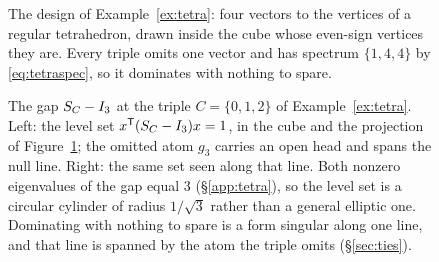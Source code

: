 \begin{figure}[ht]
  \centering
  
  \caption{The design of Example~\ref{ex:tetra}: four vectors to the
  vertices of a regular tetrahedron, drawn inside the cube whose even-sign
  vertices they are.  Every triple omits one vector and has spectrum
  $\{1,4,4\}$ by \eqref{eq:tetraspec}, so it dominates with nothing to
  spare.}
  \label{fig:tetrahedron}
\end{figure}

\begin{figure}[ht]
  \centering
  
  \caption{The gap $S_{C}-I_3$ at the triple $C=\{0,1,2\}$ of
  Example~\ref{ex:tetra}.  Left: the level set $x^{\mathsf{T}}(S_{C}-I_3)x=1$, in the
  cube and the projection of Figure~\ref{fig:tetrahedron}; the omitted atom
  $g_3$ carries an open head and spans the null line.  Right: the same set
  seen along that line.  Both nonzero eigenvalues of the gap equal $3$
  (\S\ref{app:tetra}), so the level set is a circular cylinder of radius
  $1/\sqrt3$ rather than a general elliptic one.  Dominating with nothing to
  spare is a form singular along one line, and that line is spanned by the
  atom the triple omits (\S\ref{sec:ties}).}
  \label{fig:tetragap}
\end{figure}


